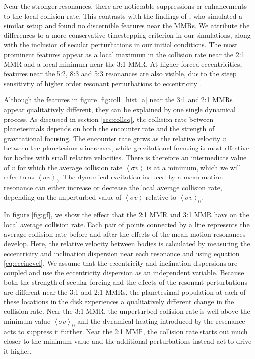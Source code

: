 \documentclass[fleqn,usenatbib]{mnras}
\begin{document}
Near the stronger resonances, there are noticeable suppressions or enhancements to the local collision rate. This contrasts with the findings of 
\citet{2000Icar..143...45R}, who simulated a similar setup and found no discernible features near the MMRs. We attribute the differences to a more 
conservative timestepping criterion in our simulations, along with the inclusion of secular perturbations in our initial conditions. The most prominent features appear as a 
local maximum in the collision rate near the 2:1 MMR and a local minimum near the 3:1 MMR. At higher forced eccentricities, features near the 5:2, 8:3 and 5:3 
resonances are also visible, due to the steep sensitivity of higher order resonant perturbations to eccentricity \citep{1994PhyD...77..289M}.

Although the features in figure \ref{fig:coll_hist_a} near the 3:1 and 2:1 MMRs appear qualitatively different, they can be explained by one single dynamical process. As discussed in 
section \ref{sec:colleq}, the collision rate between planetesimals depends on both the encounter rate and the strength of gravitational focusing. The encounter rate grows as the relative 
velocity $v$ between the planetesimals increases, while gravitational focusing is most effective for bodies with small relative velocities. There is therefore an intermediate value of $v$ for 
which the average collision rate $\left< \sigma v \right>$ is at a minimum, which we will refer to as  $\left< \sigma v \right>_{0}$. The dynamical excitation induced by a mean motion 
resonance can either increase or decrease the local average collision rate, depending on the unperturbed value of  $\left< \sigma v \right>$ relative to  $\left< \sigma v \right>_{0}$.

In figure \ref{fig:gf}, we show the effect that the 2:1 MMR and 3:1 MMR have on the local average collision rate. Each pair of points connected by a line represents the average 
collision rate before and after the effects of the mean-motion resonances develop. Here, the relative velocity between bodies is calculated by measuring the eccentricity and inclination 
dispersion near each resonance and using equation \ref{eq:eccincvel}. We assume that the eccentricity and inclination dispersions are coupled \citep{1993MNRAS.263..875I} and use the 
eccentricity dispersion as an independent variable. Because both the strength of secular forcing and the effects of the resonant perturbations are different near the 3:1 and 2:1 MMRs, the 
planetesimal population at each of these locations in the disk experiences a qualitatively different change in the collision rate. Near the 3:1 MMR, the unperturbed collision rate is well 
above the minimum value $\left< \sigma v \right>_{0}$ and the dynamical heating introduced by the resonance acts to suppress it further. Near the 2:1 MMR, the collision rate starts out 
much closer to the minimum value and the additional perturbations instead act to drive it higher.
\end{document}
